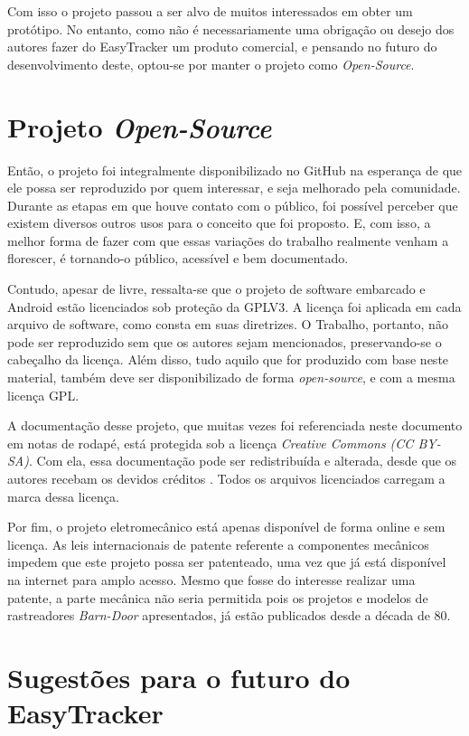 Com isso o projeto passou a ser alvo de muitos interessados em obter um protótipo. No entanto, como não é necessariamente uma obrigação ou desejo dos autores fazer do EasyTracker um produto comercial, e pensando no futuro do desenvolvimento deste, optou-se por manter o projeto como \textit{Open-Source}.

\section{Projeto \textit{Open-Source}}

Então, o projeto foi integralmente disponibilizado no GitHub na esperança de que ele possa ser reproduzido por quem interessar, e seja melhorado pela comunidade. Durante as etapas em que houve contato com o público, foi possível perceber que existem diversos outros usos para o conceito que foi proposto. E, com isso, a melhor forma de fazer com que essas variações do trabalho realmente venham a florescer, é tornando-o público, acessível e bem documentado.

Contudo, apesar de livre, ressalta-se que o projeto de software embarcado e Android estão licenciados sob proteção da GPLV3. A licença foi aplicada em cada arquivo de software, como consta em suas diretrizes. O Trabalho, portanto, não pode ser reproduzido sem que os autores sejam mencionados, preservando-se o cabeçalho da licença. Além disso, tudo aquilo que for produzido com base neste material, também deve ser disponibilizado de forma \textit{open-source}, e com a mesma licença GPL. 

A documentação desse projeto, que muitas vezes foi referenciada neste documento em notas de rodapé, está protegida sob a licença \textit{Creative Commons (CC BY-SA)}. Com ela, essa documentação pode ser redistribuída e alterada, desde que os autores recebam os devidos créditos \cite{CCBYSA}. Todos os arquivos licenciados carregam a marca dessa licença. 


Por fim, o projeto eletromecânico está apenas disponível de forma online e sem licença. As leis internacionais de patente referente a componentes mecânicos impedem que este projeto possa ser patenteado, uma vez que já está disponível na internet para amplo acesso. Mesmo que fosse do interesse realizar uma patente, a parte mecânica não seria permitida pois os projetos e modelos de rastreadores \textit{Barn-Door} apresentados, já estão publicados desde a década de 80.


\section{Sugestões para o futuro do EasyTracker}

